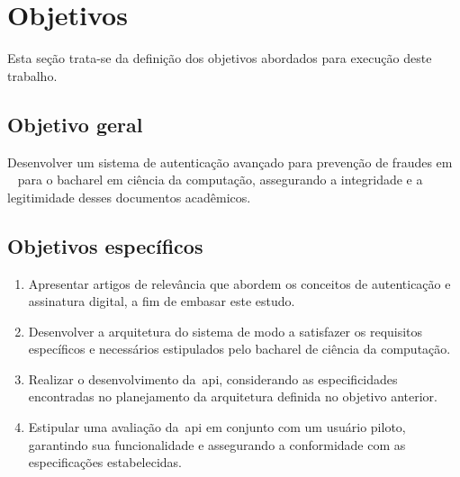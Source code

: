 \section{Objetivos}\label{sec:objetivos}

Esta seção trata-se da definição dos objetivos abordados para
execução deste trabalho.
\subsection{Objetivo geral}\label{subsec:objetivo-geral}

Desenvolver um sistema de autenticação avançado para prevenção de fraudes em
~ para o bacharel em ciência da computação, assegurando a
integridade e a legitimidade desses documentos acadêmicos.
\subsection{Objetivos específicos}\label{subsec:objetivos-especificos}

\newcommand{\buscaReferencia}{
    Apresentar artigos de relevância que abordem os conceitos de autenticação e
    assinatura digital, a fim de embasar este estudo.
}

\newcommand{\arquitetura}{
    Desenvolver a arquitetura do sistema de modo a satisfazer os requisitos
    específicos e necessários estipulados pelo bacharel de ciência da computação.
}

\newcommand{\implementacao}{
    Realizar o desenvolvimento da~\acrshort{api}, considerando as especificidades
    encontradas no planejamento da arquitetura definida no objetivo anterior.
}

\newcommand{\testes}{
    Estipular uma avaliação da~\acrshort{api} em conjunto com um usuário piloto,
    garantindo sua funcionalidade e assegurando a conformidade com as
    especificações estabelecidas.
}

\begin{enumerate}[label=\alph*)]
    \item  \buscaReferencia
    \item  \arquitetura
    \item  \implementacao
    \item  \testes
\end{enumerate}